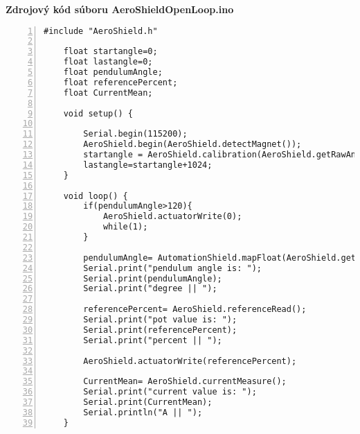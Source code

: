 \LARGE\bf{Zdrojový kód súboru AeroShieldOpenLoop.ino}
\label{AeroShieldOpenLoop.ino}
\vspace{1cm}
\begin{lstlisting}[numbers=left,basicstyle=\scriptsize,caption={Zdrojový kód súboru AeroShieldOpenLoop.ino.},captionpos=b]	
	#include "AeroShield.h" 
	
	float startangle=0; 
	float lastangle=0; 
	float pendulumAngle;  
	float referencePercent;  
	float CurrentMean; 
	
	void setup() {
		
		Serial.begin(115200);   
		AeroShield.begin(AeroShield.detectMagnet());
		startangle = AeroShield.calibration(AeroShield.getRawAngle());
		lastangle=startangle+1024;  
	}
	
	void loop() {
		if(pendulumAngle>120){
			AeroShield.actuatorWrite(0);
			while(1);
		}
		
		pendulumAngle= AutomationShield.mapFloat(AeroShield.getRawAngle(),startangle,lastangle,0.00,90.00);
		Serial.print("pendulum angle is: ");
		Serial.print(pendulumAngle); 
		Serial.print("degree || ");
		
		referencePercent= AeroShield.referenceRead();
		Serial.print("pot value is: ");
		Serial.print(referencePercent);
		Serial.print("percent || ");
		
		AeroShield.actuatorWrite(referencePercent); 
		
		CurrentMean= AeroShield.currentMeasure();
		Serial.print("current value is: ");
		Serial.print(CurrentMean);   
		Serial.println("A || ");
	}
\end{lstlisting}